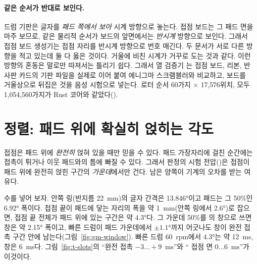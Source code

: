 \paragraph{같은 순서가 반대로 보인다.} 드럼 기판은 글자를 \emph{패드 쪽에서 보아} 시계 방향으로 놓는다. 접점
보드는 그 패드 면을 마주 보므로, 같은 물리적 순서가 보드의 앞면에서는 \emph{반시계} 방향으로 보인다. 그래서 접점
보드 생성기는 접점 자리를 반시계 방향으로 번호 매긴다. 두 문서가 서로 다른 방향을 적고 있는데 둘 다 옳은 것이다.
거울에 비친 시계가 거꾸로 도는 것과 같다. 이런 방향의 혼동은 말로만 따져서는 틀리기 쉽다. 그래서 열 검증기
는 접점 보드, 리본, 반사판 카드의 기판 파일을 실제로 이어 붙여 에니그마 스크램블러와 비교하고,
보드를 거울상으로 뒤집은 것을 음성 시험으로 넣는다. 로터 순서 60가지 × 17,576위치, 모두 1,054,560가지가 Rust 코어와
같았다().

\section{정렬: 패드 위에 확실히 얹히는 각도}\label{sec:gm-align}

\Why 접점은 패드 위에 \emph{완전히} 얹혀 있을 때만 믿을 수 있다. 패드 가장자리에 걸친 순간에는 접촉이 튀거나
이웃 패드와의 틈에 빠질 수 있다. 그래서 판정의 시험 전압()은 접점이 패드 위에 완전히 얹힌 구간의
\emph{가운데}에서만 건다. 남은 양쪽이 기계의 오차를 받는 여유다.

수를 넣어 보자. 안쪽 링(반지름 22~mm)의 글자 간격은 13.846°이고 패드는 그 50\%인 6.92° 폭이다. 접점 끝이 패드에
닿는 자리의 폭을 약 1~mm(안쪽 링에서 2.6°)로 잡으면, 접점 끝 전체가 패드 위에 있는 
구간은 약 4.3°다. 그 가운데 50\%를 의 창으로 쓰면 창은 약 2.15° 폭이고, 빠른 드럼이 패드 가운데에서
$\pm 1.1°$까지 어긋나도 창이 완전 접촉 구간 안에 남는다(그림~\ref{fig:gm-window}). 빠른 드럼 60~rpm에서 4.3°는
약 12~ms, 창은 6~ms다. 그림~\ref{fig:t-slots}의 ``완전 접촉 $-3 \ldots +9$~ms''와 `` 접점 면
$0 \ldots 6$~ms''가 이것이다.

